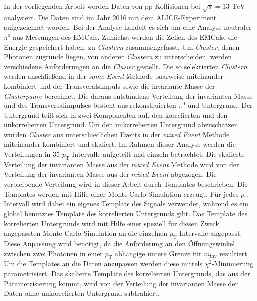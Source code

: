In der vorliegenden Arbeit werden Daten von pp-Kollisionen bei $\sqrt{s}=13\text{ TeV}$ analysiert.
Die Daten sind im Jahr 2016 mit dem ALICE-Experiment aufgezeichnet worden.
Bei der Analyse handelt es sich um eine Analyse neutraler $\pi^{0}$ aus Messungen des EMCals.
\newline
Zunächst werden die Zellen des EMCals, die Energie gespeichert haben, zu \textit{Clustern} zusammengefasst.
Um \textit{Cluster}, denen Photonen zugrunde liegen, von anderen \textit{Clustern} zu unterscheiden, werden verschiedene Anforderungen an die \textit{Cluster} gestellt.
Die so selektierten \textit{Clustern} werden anschließend in der \textit{same Event} Methode paarweise miteinander kombiniert und der Transveralsimpuls sowie die invariante Masse der \textit{Clusterpaare} berechnet.
\newline
Die daraus entstandene Verteilung der invarianten Masse und des Transversalimpulses besteht aus rekonstruierten $\pi^{0}$ und Untergrund.
Der Untergrund teilt sich in zwei Komponenten auf, den korrelierten und den unkorrelierten Untergrund.
Um den unkorrelierten Untergrund abzuschätzen wurden \textit{Cluster} aus unterschiedlichen Events in der \textit{mixed Event} Methode miteinander kombiniert und skaliert.
\newline
Im Rahmen dieser Analyse werden die Verteilungen in 35 $p_\text{T}$-Intervalle aufgeteilt und einzeln betrachtet.
Die skalierte Verteilung der invarianten Masse aus der \textit{mixed Event} Methode wird von der Verteilung der invarianten Masse aus der \textit{mixed Event} abgezogen.
\newline
Die verbleibende Verteilung wird in dieser Arbeit durch Templates beschrieben.
Die Templates werden mit Hilfe einer Monte Carlo Simulation erzeugt.
Für jedes $p_\text{T}$-Intervall wird dabei ein eigenes Template des Signals verwendet, während es ein global benutztes Template des korrelierten Untergrunds gibt.
Das Template des korrelierten Untergrunds wird mit Hilfe einer speziell für diesen Zweck angepassten Monte Carlo Simulation an die einzelnen $p_\text{T}$-Intervalle angepasst.
Diese Anpassung wird benötigt, da die Anforderung an den Öffnungswinkel zwischen zwei Photonen in einer $p_\text{T}$ abhängige untere Grenze für $m_\text{inv}$ resultiert.
\newline
Um die Templates an die Daten anzupassen werden diese mittels $\chi^{2}$-Minimierung parametrisiert.
Das skalierte Template des korrelierten Untergrunds, das aus der Parametrisierung kommt, wird von der Verteilung der invarianten Masse der Daten ohne unkorrelierten Untergrund subtrahiert.
